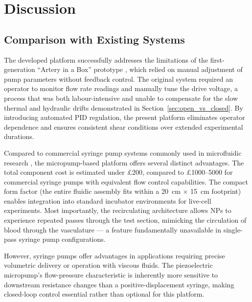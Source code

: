 
\chapter{Discussion}
\label{ch:discussion}

\section{Comparison with Existing Systems}

The developed platform successfully addresses the limitations of the first-generation ``Artery in a Box'' prototype \citep{Kacerik2024}, which relied on manual adjustment of pump parameters without feedback control. The original system required an operator to monitor flow rate readings and manually tune the drive voltage, a process that was both labour-intensive and unable to compensate for the slow thermal and hydraulic drifts demonstrated in Section~\ref{sec:open_vs_closed}. By introducing automated PID regulation, the present platform eliminates operator dependence and ensures consistent shear conditions over extended experimental durations.

Compared to commercial syringe pump systems commonly used in microfluidic research \citep{Whitesides2006, Squires2005}, the micropump-based platform offers several distinct advantages. The total component cost is estimated under \pounds200, compared to \pounds1000--5000 for commercial syringe pumps with equivalent flow control capabilities. The compact form factor (the entire fluidic assembly fits within a \SI{20}{\centi\metre} $\times$ \SI{15}{\centi\metre} footprint) enables integration into standard incubator environments for live-cell experiments. Most importantly, the recirculating architecture allows NPs to experience repeated passes through the test section, mimicking the circulation of blood through the vasculature --- a feature fundamentally unavailable in single-pass syringe pump configurations.

However, syringe pumps offer advantages in applications requiring precise volumetric delivery or operation with viscous fluids. The piezoelectric micropump's flow-pressure characteristic is inherently more sensitive to downstream resistance changes than a positive-displacement syringe, making closed-loop control essential rather than optional for this platform.

